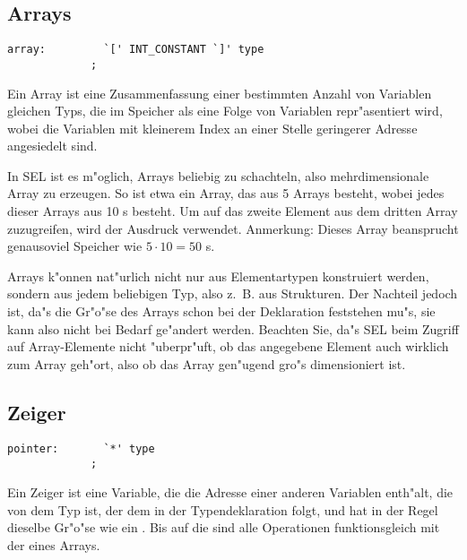 \subsection{Arrays}

\begin{verbatim}
array:         `[' INT_CONSTANT `]' type
             ;
\end{verbatim}

Ein Array ist eine Zusammenfassung einer bestimmten Anzahl von
Variablen gleichen Typs, die im Speicher als eine Folge von
Variablen
repr"asentiert wird, wobei die Variablen mit kleinerem
Index an einer Stelle geringerer Adresse angesiedelt sind.

In SEL ist es m"oglich, Arrays beliebig zu schachteln, also
mehrdimensionale Array zu erzeugen. So ist etwa
 ein Array, das aus 5 Arrays besteht,
wobei jedes dieser Arrays aus 10 \tint s besteht. Um auf das
zweite Element aus dem dritten Array zuzugreifen, wird der
Ausdruck  verwendet. Anmerkung: Dieses Array
beansprucht genausoviel Speicher wie $5 \cdot 10 = 50$ \tint s.

Arrays k"onnen nat"urlich nicht nur aus Elementartypen
konstruiert werden, sondern aus jedem beliebigen Typ, also z.~B.
aus Strukturen. Der Nachteil jedoch ist, da"s die
Gr"o"se des Arrays schon bei der Deklaration feststehen mu"s, sie
kann also nicht bei Bedarf ge"andert werden. Beachten Sie, da"s
SEL beim Zugriff auf Array-Elemente nicht "uberpr"uft, ob das
angegebene Element auch wirklich zum Array geh"ort, also ob das
Array gen"ugend gro"s dimensioniert ist.

\subsection{Zeiger}

\begin{verbatim}
pointer:       `*' type
             ;
\end{verbatim}

Ein Zeiger ist eine Variable, die die Adresse
einer anderen
Variablen enth"alt, die von dem Typ ist, der dem \fu{*} in der
Typendeklaration folgt, und hat in der Regel dieselbe Gr"o"se wie
ein \tint . Bis auf die  sind alle Operationen
funktionsgleich mit der eines Arrays.

